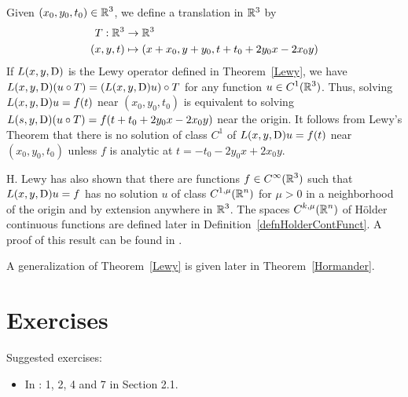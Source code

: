 \begin{rmk}
Given $\displaystyle (x_0,y_0,t_0) \in \mathbb{R}^3$, we define a translation in $\mathbb{R}^3$ by
\begin{align*}
T:\mathbb{R}^3 &\to \mathbb{R}^3 \\
 (x,y,t) &\mapsto (x+x_0,y+y_0, t+t_0 +2y_0x - 2x_0 y)
\end{align*}
If $L(x,y,\operatorname{D})$ is the Lewy operator defined in Theorem~\ref{Lewy}, we have
$\displaystyle L(x,y,\operatorname{D})(u \circ T) = \left(L(x,y,\operatorname{D})u\right) \circ T$
for any function $\displaystyle u \in C^1(\mathbb{R}^3)$.
Thus, solving $L(x,y,\operatorname{D})u = f(t)$ near $(x_0,y_0,t_0)$ is
equivalent to solving $L(s,y,\operatorname{D})(u\circ T) = f(t+t_0+2y_0x - 2x_0y)$ near the
origin.  It follows from Lewy's Theorem that there is no solution of
class $C^1$ of $L(x,y,\operatorname{D})u = f(t)$ near $(x_0,y_0,t_0)$ unless $f$ is
analytic at $t=-t_0-2y_0x + 2x_0y$.

H. Lewy has also shown that there are functions
$\displaystyle f \in C^{\infty}(\mathbb{R}^3)$
such that $L(x,y,\operatorname{D})u = f$ has no solution $u$ of class
$\displaystyle C^{1,\mu}(\mathbb{R}^n)$ for $\mu > 0$ in a neighborhood of
the origin and by extension anywhere in $\displaystyle \mathbb{R}^3$.  The spaces
$\displaystyle C^{k,\mu}(\mathbb{R}^n)$ of Hölder continuous functions are
defined later in Definition~\ref{defnHolderContFunct}.  A proof of
this result can be found in \cite{Smo}.
\end{rmk}

A generalization of Theorem~\ref{Lewy} is given later in
Theorem~\ref{Hormander}.

\section{Exercises}

Suggested exercises:

\begin{itemize}
\item In \cite{McO}: 1, 2, 4 and 7 in Section 2.1.
\end{itemize}


